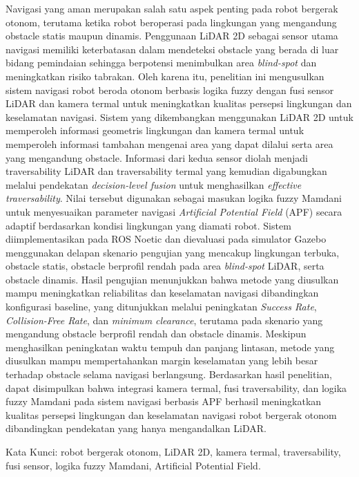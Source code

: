 Navigasi yang aman merupakan salah satu aspek penting pada robot bergerak otonom, terutama ketika robot beroperasi pada lingkungan yang mengandung obstacle statis maupun dinamis. Penggunaan LiDAR 2D sebagai sensor utama navigasi memiliki keterbatasan dalam mendeteksi obstacle yang berada di luar bidang pemindaian sehingga berpotensi menimbulkan area \textit{blind-spot} dan meningkatkan risiko tabrakan. Oleh karena itu, penelitian ini mengusulkan sistem navigasi robot beroda otonom berbasis logika fuzzy dengan fusi sensor LiDAR dan kamera termal untuk meningkatkan kualitas persepsi lingkungan dan keselamatan navigasi. Sistem yang dikembangkan menggunakan LiDAR 2D untuk memperoleh informasi geometris lingkungan dan kamera termal untuk memperoleh informasi tambahan mengenai area yang dapat dilalui serta area yang mengandung obstacle. Informasi dari kedua sensor diolah menjadi traversability LiDAR dan traversability termal yang kemudian digabungkan melalui pendekatan \textit{decision-level fusion} untuk menghasilkan \textit{effective traversability}. Nilai tersebut digunakan sebagai masukan logika fuzzy Mamdani untuk menyesuaikan parameter navigasi \textit{Artificial Potential Field} (APF) secara adaptif berdasarkan kondisi lingkungan yang diamati robot. Sistem diimplementasikan pada ROS Noetic dan dievaluasi pada simulator Gazebo menggunakan delapan skenario pengujian yang mencakup lingkungan terbuka, obstacle statis, obstacle berprofil rendah pada area \textit{blind-spot} LiDAR, serta obstacle dinamis. Hasil pengujian menunjukkan bahwa metode yang diusulkan mampu meningkatkan reliabilitas dan keselamatan navigasi dibandingkan konfigurasi baseline, yang ditunjukkan melalui peningkatan \textit{Success Rate}, \textit{Collision-Free Rate}, dan \textit{minimum clearance}, terutama pada skenario yang mengandung obstacle berprofil rendah dan obstacle dinamis. Meskipun menghasilkan peningkatan waktu tempuh dan panjang lintasan, metode yang diusulkan mampu mempertahankan margin keselamatan yang lebih besar terhadap obstacle selama navigasi berlangsung. Berdasarkan hasil penelitian, dapat disimpulkan bahwa integrasi kamera termal, fusi traversability, dan logika fuzzy Mamdani pada sistem navigasi berbasis APF berhasil meningkatkan kualitas persepsi lingkungan dan keselamatan navigasi robot bergerak otonom dibandingkan pendekatan yang hanya mengandalkan LiDAR.

Kata Kunci: robot bergerak otonom, LiDAR 2D, kamera termal, traversability, fusi sensor, logika fuzzy Mamdani, Artificial Potential Field.
